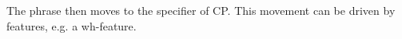 \documentclass[crop]{standalone}
\begin{document}
The phrase then moves to the specifier of CP.
This movement can be driven by features, e.g. a wh-feature.
\end{document}
